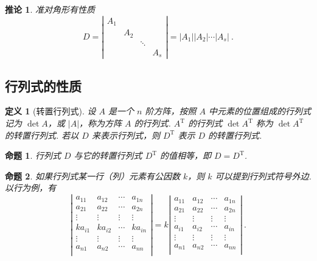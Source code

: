 \documentclass[zihao=-4,UTF8,linespread=1.8,nothm]{aytony_base}
\newtheorem*{proposition*}{\indent 命题}
\newtheorem*{corollary}{\indent 推论}
\newtheorem{definition}{\indent 定义}[subsection]
\begin{document}
\begin{corollary}
    准对角形有性质 $$
        D = \left|
        \begin{matrix}
            A_1 &                    \\
                & A_2                \\
                &     & \ddots       \\
                &     &        & A_s
        \end{matrix}
        \right| = |A_1||A_2|\cdots|A_s|\ .
    $$
\end{corollary}


\subsection{行列式的性质}

\begin{definition}[转置行列式]
    设 $A$ 是一个 $n$ 阶方阵，按照 $A$ 中元素的位置组成的行列式记为 $\det A$，或 $|A|$，称为方阵 $A$ 的行列式. $A ^{\mathrm{T}}$ 的行列式 $\det A ^{\mathrm{T}}$ 称为 $\det A ^{\mathrm{T}}$ 的转置行列式. 若以 $D$ 来表示行列式，则 $D ^{\mathrm{T}}$ 表示 $D$ 的转置行列式.
\end{definition}

\begin{proposition*}
    行列式 $D$ 与它的转置行列式 $D ^{\mathrm{T}}$ 的值相等，即 $D = D ^{\mathrm{T}}$.
\end{proposition*}

\begin{proposition*}
    如果行列式某一行（列）元素有公因数 $k$，则 $k$ 可以提到行列式符号外边. 以行为例，有 $$
        \left|
        \begin{matrix}
            a_{11}  & a_{12}  & \cdots & a_{1n}  \\
            a_{21}  & a_{22}  & \cdots & a_{2n}  \\
            \vdots  & \vdots  & \vdots & \vdots  \\
            ka_{i1} & ka_{i2} & \cdots & ka_{in} \\
            \vdots  & \vdots  & \vdots & \vdots  \\
            a_{n1}  & a_{n2}  & \cdots & a_{nn}  \\
        \end{matrix}
        \right| = k\left|
        \begin{matrix}
            a_{11} & a_{12} & \cdots & a_{1n} \\
            a_{21} & a_{22} & \cdots & a_{2n} \\
            \vdots & \vdots & \vdots & \vdots \\
            a_{i1} & a_{i2} & \cdots & a_{in} \\
            \vdots & \vdots & \vdots & \vdots \\
            a_{n1} & a_{n2} & \cdots & a_{nn} \\
        \end{matrix}
        \right|\ .
    $$
\end{proposition*}
\end{document}
